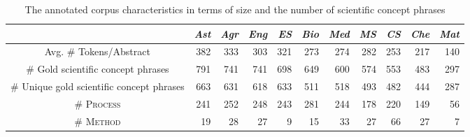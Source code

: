 \documentclass[runningheads]{llncs}
\begin{document}
\begin{table*}[htb]
\centering
\small
\caption{The annotated corpus characteristics in terms of size and the number of scientific concept phrases}
\begin{tabular}{c|rrrrrrrrrr}
                         & \textit{Ast} & \textit{Agr} & \textit{Eng} & \textit{ES} & \textit{Bio} & \textit{Med} & \textit{MS} & \textit{CS} & \textit{Che} & \textit{Mat} \\ \hline
Avg. \# Tokens/Abstract                      & 382                           & 333                           & 303                           & 321                          & 273                           & 274                           & 282                          & 253                          & 217                           & 140                           \\
\# Gold scientific concept phrases                     & 791                           & 741                           & 741                           & 698                          & 649                           & 600                           & 574                          & 553                          & 483                           & 297                           \\
\# Unique gold scientific concept phrases        & 663                           & 631                           & 618                           & 633                          & 511                           & 518                           & 493                          & 482                          & 444                           & 287                           \\
\# \textsc{Process}  & 241                           & 252                           & 248                           & 243                          & 281                           & 244                           & 178                          & 220                          & 149                           & 56                            \\

\# \textsc{Method}     & 19                            & 28                            & 27                            & 9                            & 15                            & 33                            & 27                           & 66                           & 27                            & 7                             \\


\end{tabular}
\end{table*}
\end{document}
